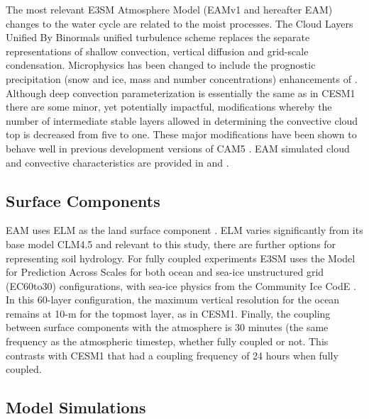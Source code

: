 \documentclass[draft,ms]{AGUTeX}
\begin{document}
\begin{article}
The most relevant E3SM Atmosphere Model (EAMv1 and hereafter EAM) changes to the water cycle are related to the moist processes. The Cloud Layers Unified By Binormals \citep[CLUBB,][]{Golaz2002} unified turbulence scheme replaces the separate representations of shallow convection, vertical diffusion and grid-scale condensation. Microphysics has been changed to include the prognostic precipitation (snow and ice, mass and number concentrations) enhancements of \cite{Gettelman2015}. Although deep convection parameterization is essentially the same as in CESM1 there are some minor, yet potentially impactful, modifications whereby the number of intermediate stable layers allowed in determining the convective cloud top is decreased from five to one. These major modifications have been shown to behave well in previous development versions of CAM5 \citep{Bogenschutz2018}. EAM simulated cloud and convective characteristics are provided in \cite{Xie2018} and \cite{Zhang2019}. 

\subsection{Surface Components}

EAM uses ELM as the land surface component \citep{Ricciuto2018}. ELM varies significantly from its base model CLM4.5 and relevant to this study, there are further options for representing soil hydrology. For fully coupled experiments E3SM uses the Model for Prediction Across Scales \citep[MPAS, ][]{Ringler2013} for both ocean and sea-ice unstructured grid (EC60to30) configurations, with sea-ice physics from the Community Ice CodE \citep[CICE,][]{HunkeE.C.Lipscomb2010}. In this 60-layer configuration, the maximum vertical resolution for the ocean remains at 10-m for the topmost layer, as in CESM1. Finally, the coupling between surface components with the atmosphere is 30 minutes (the same frequency as the atmospheric timestep, whether fully coupled or not. This contrasts with CESM1 that had a coupling frequency of 24 hours when fully coupled.

\subsection {Model Simulations}


\end{article}
\end{document}
